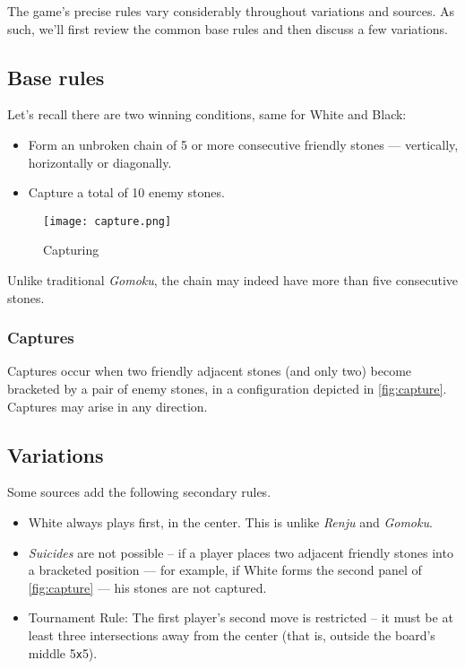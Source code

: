 \documentclass[12pt,a4paper,notitlepage]{article}
\newcommand*{\boardsize}[1]{#1\texttt{x}#1}
\begin{document}
The game's precise rules vary considerably throughout variations and sources. As such, we'll first review the common base rules and then discuss a few variations.

\subsection{Base rules}
\label{subsec:baserules}

Let's recall there are two winning conditions, same for White and Black:

\begin{itemize}
	\large
	\item Form an unbroken chain of 5 or more consecutive friendly stones --- vertically, horizontally or diagonally.
	\item Capture a total of 10 enemy stones.
\end{itemize}

\begin{wrapfigure}[8]{r}[2em]{0.3\textwidth}
	\vspace*{-3\baselineskip}
	\texttt{[image: capture.png]}
	\caption{Capturing\supercite{pente-net} \label{fig:capture}}
\end{wrapfigure}

Unlike traditional \textit{Gomoku}, the chain may indeed have more than five consecutive stones.

\subsubsection{Captures}
\label{subsubsec:captures}

Captures occur when two friendly adjacent stones (and only two) become bracketed by a pair of enemy stones, in a configuration depicted in \autoref{fig:capture}. Captures may arise in any direction.

\subsection{Variations}
\label{subsec:variations}

Some sources add the following secondary rules.

\begin{itemize}
	\item White always plays first, in the center.\supercite{pente-renjunu, pente-wikipedia} This is unlike \textit{Renju} and \textit{Gomoku}.
	\item \textsl{Suicides} are not possible -- if a player places two adjacent friendly stones into a bracketed position --- for example, if White forms the second panel of \autoref{fig:capture} --- his stones are not captured.\supercite{pente-renjunu,pente-org,pente-wikipedia,pente-winning-moves}
	\item Tournament Rule: The first player's second move is restricted -- it must be at least three intersections away from the center (that is, outside the board's middle \boardsize{5}).\supercite{pente-net,pente-org,pente-wikipedia,pente-winning-moves}
\end{itemize}
\end{document}
